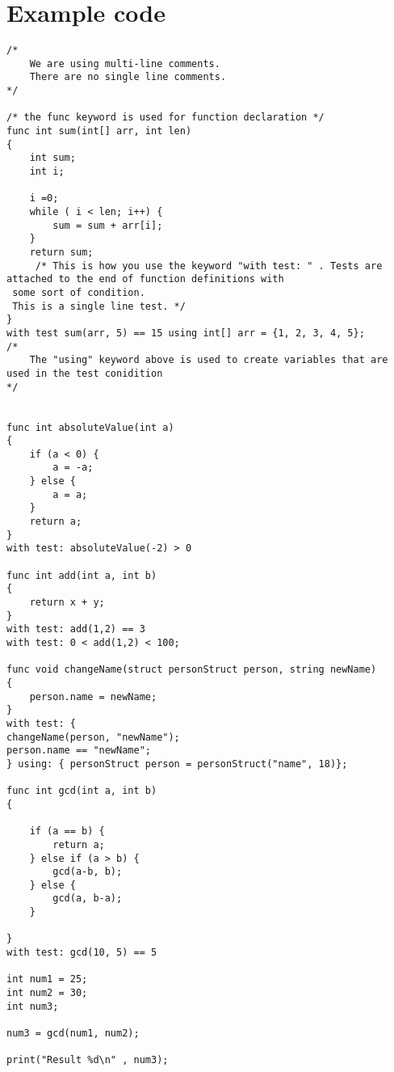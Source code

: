 \documentclass{article}
\begin{document}
\section{Example code}
\begin{lstlisting}
/*
	We are using multi-line comments.
	There are no single line comments.
*/

/* the func keyword is used for function declaration */
func int sum(int[] arr, int len)
{
	int sum;
	int i;
	
	i =0;
	while ( i < len; i++) {
		sum = sum + arr[i];
	}
	return sum;
	 /* This is how you use the keyword "with test: " . Tests are 
attached to the end of function definitions with
 some sort of condition.
 This is a single line test. */
}
with test sum(arr, 5) == 15 using int[] arr = {1, 2, 3, 4, 5};
/*
	The "using" keyword above is used to create variables that are used in the test conidition
*/


func int absoluteValue(int a)
{
	if (a < 0) {
		a = -a;
	} else {
		a = a;
	}
	return a;
}
with test: absoluteValue(-2) > 0  

func int add(int a, int b)
{
	return x + y;
}
with test: add(1,2) == 3
with test: 0 < add(1,2) < 100;

func void changeName(struct personStruct person, string newName)
{
	person.name = newName;
}
with test: {
changeName(person, "newName");
person.name == "newName";
} using: { personStruct person = personStruct("name", 18)};

func int gcd(int a, int b)
{

	if (a == b) {
		return a;
	} else if (a > b) {
		gcd(a-b, b);
	} else {
		gcd(a, b-a);
	}

}
with test: gcd(10, 5) == 5

int num1 = 25;
int num2 = 30;
int num3;

num3 = gcd(num1, num2);

print("Result %d\n" , num3);

\end{lstlisting}
\end{document}
